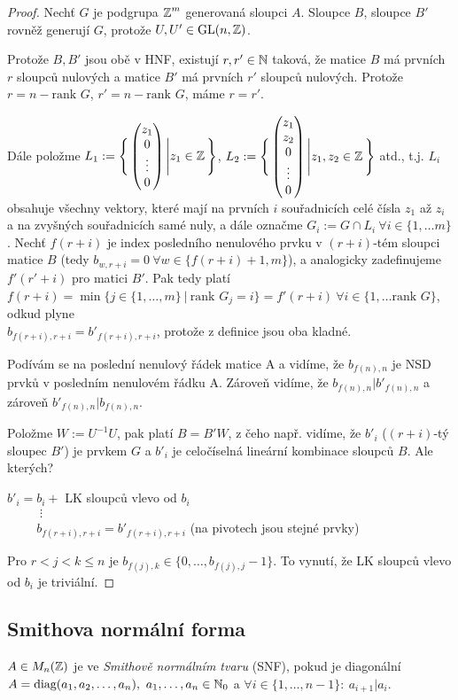 \begin{proof}
Nechť $G$ je podgrupa $\operatorname{\mathbb{Z}}^m$ generovaná sloupci $A$. Sloupce $B$, sloupce $B'$ rovněž generují $G$, protože $U, U'\in\operatorname{GL}(n,\operatorname{\mathbb{Z}})$.

Protože $B,B'$ jsou obě v HNF, existují $r,r' \in \operatorname{\mathbb{N}}$ taková, že matice $B$ má prvních $r$ sloupců nulových a matice $B'$ má prvních $r'$ sloupců nulových. Protože $r=n-\text{rank } G$, $r'=n-\text{rank } G$, máme $r=r'$.

Dále položme $L_1:=\Bigg\{\begin{pmatrix} z_1 \\ 0 \\ \vdots \\ 0 \end{pmatrix}\Bigg|z_1\in\operatorname{\mathbb{Z}}\Bigg\}$, $L_2:=\Bigg\{\begin{pmatrix} z_1 \\ z_2 \\ 0 \\ \vdots \\ 0 \end{pmatrix}\Bigg|z_1,z_2\in\operatorname{\mathbb{Z}}\Bigg\}$ atd., t.j. $L_i$ obsahuje všechny vektory, které mají na prvních $i$ souřadnicích celé čísla $z_1$ až $z_i$ a na zvyšných souřadnicích samé nuly, a dále označme
$G_i:=G\cap L_i \ \forall i \in \{1,\dots m \}$. Nechť $f(r+i)$ je index posledního nenulového prvku v $(r+i)$-tém sloupci matice $B$ (tedy $b_{w,r+i} = 0 \ \forall w \in \{f(r+i)+1,m\}$), a analogicky zadefinujeme $f'(r'+i)$ pro matici $B'$. Pak tedy platí\\ $f(r+i)=\min\{j\in\{1,\ldots,m\}\ |\ \text{rank } G_j=i\}=f'(r+i) \ \forall i \in \{1,\dots\text{rank }G\}$, odkud plyne\\ $b_{f(r+i),r+i}=b'_{f(r+i),r+i}$, protože z definice jsou oba kladné.

Podívám se na poslední nenulový řádek matice A a vidíme, že $b_{f(n),n}$ je NSD prvků v posledním nenulovém řádku A. Zároveň vidíme, že $b_{f(n),n}|b'_{f(n),n}$ a zároveň $b'_{f(n),n}|b_{f(n),n}$.

Položme $W:=U^{-1}U$, pak platí $B=B'W$, z čeho např. vidíme, že $b'_i$ ($(r+i)$-tý sloupec $B'$) je prvkem $G$ a $b'_i$ je celočíselná lineární kombinace sloupců $B$. Ale kterých?

$b'_i=b_i+$ LK sloupců vlevo od $b_i$\\
$\phantom{b'_i=.}\vdots$\\
$\phantom{b'_i=}b_{f(r+i),r+i}= b'_{f(r+i),r+i}$ (na pivotech jsou stejné prvky)

Pro $r<j<k\leq n$ je $b_{f(j),k}\in\{0,\ldots,b_{f(j),j}-1\}$. To vynutí, že LK sloupců vlevo od $b_i$ je triviální.
\end{proof}

\subsection{Smithova normální forma}
\begin{definition}
$A\in M_{n}(\operatorname{\mathbb{Z}})$ je ve \emph{Smithově normálním tvaru} (SNF), pokud je diagonální $A=\text{diag}(a_1,a_2,\ldots,a_n), \ a_1,\ldots,a_n\in \N_0$ a $\forall i\in\{1,\ldots,n-1\}: \ a_{i+1}|a_i$.
\end{definition}

